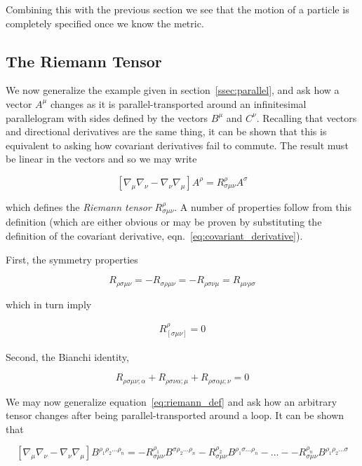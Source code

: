 Combining this with the previous section we see that the motion of a
particle is completely specified once we know the metric.

\subsection{The Riemann Tensor}

We now generalize the example given in section~\ref{ssec:parallel}, and
ask how a vector $A^\mu$ changes as it is parallel-transported around
an infinitesimal parallelogram with sides defined by the vectors
$B^\mu$ and $C^\nu$.  Recalling that vectors and directional
derivatives are the same thing, it can be shown that this is
equivalent to asking how covariant derivatives fail to commute.  The
result must be linear in the vectors and so we may write

\begin{equation}
\label{eq:riemann_def}
\left[\nabla_\mu \nabla_\nu - \nabla_\nu \nabla_\mu\right] A^\rho
= R^\rho_{\sigma\mu\nu} A^\sigma
\end{equation}

which defines the \emph{Riemann tensor} $R^\rho_{\sigma\mu\nu}$.  A
number of properties follow from this definition (which are either
obvious or may be proven by substituting the definition of the
covariant derivative, eqn.~\ref{eq:covariant_derivative}).

First, the symmetry properties

\begin{equation}
\label{eq:symmetries}
R_{\rho\sigma\mu\nu}
= -R_{\sigma\rho\mu\nu}
= -R_{\rho\sigma\nu\mu}
= R_{\mu\nu\rho\sigma}
\end{equation}

which in turn imply

\begin{align}
R^\rho_{[\sigma\mu\nu]} = 0
\end{align}

Second, the Bianchi identity,

\begin{equation}
\label{eq:bianchi}
R_{\rho\sigma\mu\nu;\alpha}
+R_{\rho\sigma\nu\alpha;\mu}
+R_{\rho\sigma\alpha\mu;\nu} = 0
\end{equation}

We may now generalize equation~\ref{eq:riemann_def} and ask how an
arbitrary tensor changes after being parallel-transported 
around a loop.  It can be shown that

\begin{equation}
\label{eq:higher_order_riemann}
\left[\nabla_\mu \nabla_\nu - \nabla_\nu \nabla_\mu\right] 
B^{\rho_1 \rho_2 \ldots \rho_n}
= - R^{\rho_1}_{\sigma \mu\nu} B^{\sigma \rho_2 \ldots \rho_n}
- R^{\rho_2}_{\sigma \mu\nu} B^{\rho_1 \sigma \ldots \rho_n}
- \ldots -
- R^{\rho_n}_{\sigma \mu\nu} B^{\rho_1 \rho_2 \ldots \sigma }
\end{equation}

